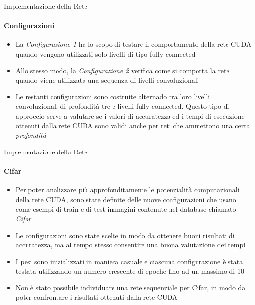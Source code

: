 \documentclass[
 ]{beamer}
\begin{document}
\begin{frame}{Implementazione della Rete}
    \framesubtitle{Configurazioni}

    \begin{itemize} [<+->]
        \setlength\itemsep{2em}
        \item \large La \emph{Configurazione 1} ha lo scopo di testare il comportamento della rete CUDA quando vengono utilizzati solo livelli di tipo fully-connected
        \item \large Allo stesso modo, la \emph{Configurazione 2} verifica come si comporta la rete quando viene utilizzata una sequenza di livelli convoluzionali    
        \item \large Le restanti configurazioni sono costruite alternado tra loro livelli convoluzionali di profondità tre e livelli fully-connected. Questo tipo di approccio serve a valutare se i valori di accuratezza ed i tempi di esecuzione ottenuti dalla rete CUDA sono validi anche per reti che ammettono una certa \emph{profondità}
    \end{itemize}     
\end{frame}


\begin{frame}{Implementazione della Rete}
    \framesubtitle{Cifar}

    \begin{itemize} [<+->]
        \setlength\itemsep{1em}
        \item \large Per poter analizzare più approfonditamente le potenzialità computazionali della rete CUDA, sono state definite delle nuove configurazioni che usano come esempi di train e di test immagini contenute nel database chiamato \emph{Cifar}
        \item \large Le configurazioni sono state scelte in modo da ottenere buoni risultati di accuratezza, ma al tempo stesso consentire una buona valutazione dei tempi 
        \item \large I pesi sono inizializzati in maniera casuale e ciascuna configurazione è stata testata utilizzando un numero crescente di epoche fino ad un massimo di 10
        \item \large Non è stato possibile individuare una rete sequenziale per Cifar, in modo da poter confrontare i risultati ottenuti dalla rete CUDA
    \end{itemize}     
\end{frame}
\end{document}
